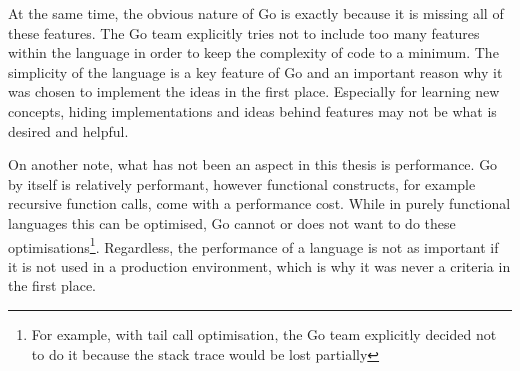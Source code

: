 At the same time, the obvious nature of Go is exactly because it is missing all
of these features. The Go team explicitly tries not to include too many features within
the language in order to keep the complexity of code to a minimum\autocite{go-feature}.
The simplicity of the language is a key feature of Go and an important reason why it was
chosen to implement the ideas in the first place.
Especially for learning new concepts, hiding implementations and ideas behind features
may not be what is desired and helpful.

On another note, what has not been an aspect in this thesis is
performance. Go by itself is relatively performant, however functional constructs, for example
recursive function calls, come with a performance cost. While in purely functional languages
this can be optimised, Go cannot or does not want to do these optimisations\footnote{For example,
with tail call optimisation, the Go team explicitly decided not to do it because the stack trace
would be lost partially}. Regardless, the performance of a language is not as important if it
is not used in a production environment, which is why it was never a criteria in the first place.
